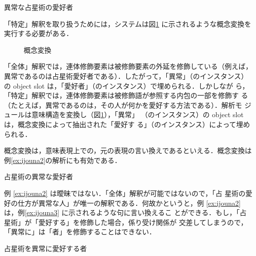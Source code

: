 \begin{exx}\rm
  \label{ex:ijouna1}
  \hspace*{.5cm} 異常な占星術の愛好者

\vspace*{3mm}

  \begin{center}
  \end{center}
\end{exx}

「特定」解釈を取り扱うためには，システムは図\ref{fig:Concept_Conversion} 
に示されるような概念変換\cite{Isahara95e}を実行する必要がある．

\begin{figure}[htb]
  \begin{center}
    \label{fig:isahara3}
    \caption{概念変換}
    \label{fig:Concept_Conversion}
  \end{center}
\end{figure}

「全体」解釈では，連体修飾要素は被修飾要素の外延を修飾している（例えば，
異常であるのは占星術愛好者である）．したがって，「異常」（のインスタンス）
の object slot は，「愛好者」（のインスタンス）で埋められる．しかしなが
ら，「特定」解釈では，連体修飾要素は被修飾語が参照する内包の一部を修飾す 
る（たとえば，異常であるのは，その人が何かを愛好する方法である）．解析モ
ジュールは意味構造を変換し（図\ref{fig:Concept_Conversion}），「異常」
（のインスタンス）の object slot は，概念変換によって抽出された「愛好す
る」（のインスタンス）によって埋められる．

概念変換は，意味表現上での，元の表現の言い換えであるといえる．概念変換は
例\ref{ex:ijouna2}の解析にも有効である．

\begin{exx}\rm
  \label{ex:ijouna2}
  \hspace*{.5cm} 占星術の異常な愛好者
\end{exx}

例 \ref{ex:ijouna2} は曖昧ではない．「全体」解釈が可能ではないので，「占
星術の愛好の仕方が異常な人」が唯一の解釈である．何故かというと，例 
\ref{ex:ijouna2} は，例\ref{ex:ijouna3} に示されるような句に言い換えるこ
とができる．もし，「占星術」が「愛好する」を修飾した場合，係り受け関係が
交差してしまうので，「異常に」は「者」を修飾することはできない．

\begin{exx}\rm
  \label{ex:ijouna3}
  \hspace*{.5cm} 占星術を異常に愛好する者
\end{exx}

